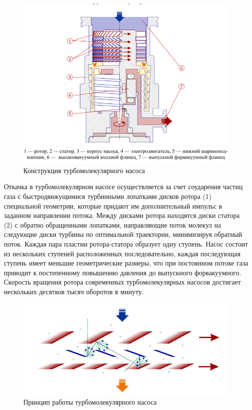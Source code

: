 \documentclass[a4paper, 12pt]{article} %
\begin{document}
\begin{figure}[h]
    \centering
    \includegraphics[width = 12 cm]{ТМН}
    \caption{Конструкция турбомолекулярного насоса}
    \label{fig:vac}
\end{figure}

Откачка в турбомолекулярном насосе осуществляется за
счет соударения частиц газа с быстродвижущимися турбинными лопатками дисков ротора (1) специальной геометрии, которые придают им дополнительный импульс в заданном направлении потока. Между дисками ротора находятся диски статора (2) с обратно обращенными лопатками, направляющие поток молекул на следующие диски турбины по оптимальной траектории, минимизируя обратный поток. Каждая пара пластин ротора-статора образует одну ступень. Насос состоит из нескольких ступеней расположенных последовательно, каждая последующая ступень имеет меньшие геометрические размеры, что при постоянном потоке
газа приводит к постепенному повышению давления до выпускного форвакуумного. Скорость вращения ротора современных турбомолекулярных
насосов достигает нескольких десятков тысяч оборотов в минуту.

\begin{figure}[h]
    \centering
    \includegraphics[width = 10.5 cm]{Принцип ТМН}
    \caption{Принцип работы турбомолекулярного насоса}
    \label{fig:vac}
\end{figure}
\end{document}
